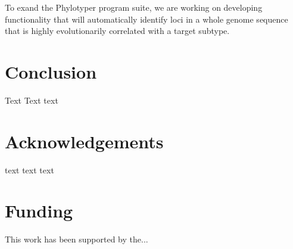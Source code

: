 \documentclass{bioinfo}
\begin{document}
To exand the Phylotyper program suite, we are working on developing functionality that will automatically identify loci in a whole genome sequence that is highly evolutionarily correlated with a target subtype.










%
%


\section{Conclusion}

Text Text text\vspace*{-10pt}


\section*{Acknowledgements}

text text text\vspace*{-12pt}


\section*{Funding}

This work has been supported by the... \vspace*{-12pt}


% 
% 
% 
%

%






\end{document}
